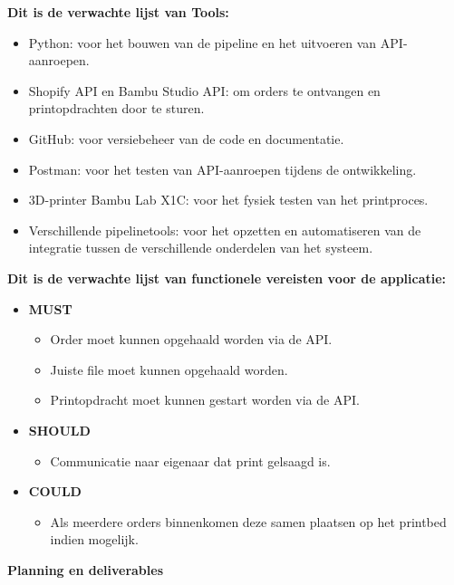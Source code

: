 \vspace{1em}
\textbf{Dit is de verwachte lijst van Tools:}\\
\begin{itemize}
\item Python: voor het bouwen van de pipeline en het uitvoeren van API-aanroepen.
\item Shopify API en Bambu Studio API: om orders te ontvangen en printopdrachten door te sturen.
\item GitHub: voor versiebeheer van de code en documentatie.
\item Postman: voor het testen van API-aanroepen tijdens de ontwikkeling.
\item 3D-printer Bambu Lab X1C: voor het fysiek testen van het printproces.
\item Verschillende pipelinetools: voor het opzetten en automatiseren van de integratie tussen de verschillende onderdelen van het systeem.
\end{itemize}

\vspace{1em}
\textbf{Dit is de verwachte lijst van functionele vereisten voor de applicatie:}\\
\begin{itemize}
    \item \textbf{MUST}
    \begin{itemize}
        \item Order moet kunnen opgehaald worden  via de API.
        \item Juiste file moet kunnen opgehaald worden.
        \item Printopdracht moet kunnen gestart worden via de API.
    \end{itemize}
    \item \textbf{SHOULD}
    \begin{itemize}
        \item Communicatie naar eigenaar dat print gelsaagd is.
    \end{itemize}
    \item \textbf{COULD}
    \begin{itemize}
        \item Als meerdere orders binnenkomen deze samen plaatsen op het printbed indien mogelijk.
    \end{itemize}
\end{itemize}

\vspace{1em}
\textbf{Planning en deliverables}

